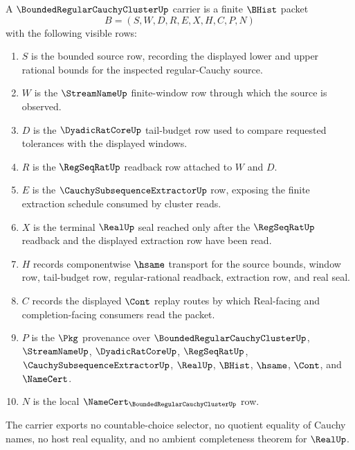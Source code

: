 \begin{definition}
\label{def:bounded-regular-cauchy-cluster-carrier}
A $\BoundedRegularCauchyClusterUp$ carrier is a finite $\BHist$ packet
$$
B=(S,W,D,R,E,X,H,C,P,N)
$$
with the following visible rows:
\begin{enumerate}
\item $S$ is the bounded source row, recording the displayed lower and upper rational bounds for the inspected regular-Cauchy source.
\item $W$ is the $\StreamNameUp$ finite-window row through which the source is observed.
\item $D$ is the $\DyadicRatCoreUp$ tail-budget row used to compare requested tolerances with the displayed windows.
\item $R$ is the $\RegSeqRatUp$ readback row attached to $W$ and $D$.
\item $E$ is the $\CauchySubsequenceExtractorUp$ row, exposing the finite extraction schedule consumed by cluster reads.
\item $X$ is the terminal $\RealUp$ seal reached only after the $\RegSeqRatUp$ readback and the displayed extraction row have been read.
\item $H$ records componentwise $\hsame$ transport for the source bounds, window row, tail-budget row, regular-rational readback, extraction row, and real seal.
\item $C$ records the displayed $\Cont$ replay routes by which Real-facing and completion-facing consumers read the packet.
\item $P$ is the $\Pkg$ provenance over $\BoundedRegularCauchyClusterUp$, $\StreamNameUp$, $\DyadicRatCoreUp$, $\RegSeqRatUp$, $\CauchySubsequenceExtractorUp$, $\RealUp$, $\BHist$, $\hsame$, $\Cont$, and $\NameCert$.
\item $N$ is the local $\NameCert_{\BoundedRegularCauchyClusterUp}$ row.
\end{enumerate}
The carrier exports no countable-choice selector, no quotient equality of Cauchy names, no host real equality, and no ambient completeness theorem for $\RealUp$.
\end{definition}

